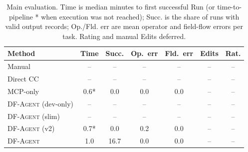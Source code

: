 \begin{table}[t]
\centering
\small
\setlength{\tabcolsep}{3pt}
\begin{tabular}{lcccccc}
\toprule
Method & Time & Succ. & Op.\ err & Fld.\ err & Edits & Rat. \\
\midrule
Manual & -- & -- & -- & -- & -- & -- \\
Direct CC & -- & -- & -- & -- & -- & -- \\
MCP-only & 0.6* & 0.0 & 0.0 & 0.0 & -- & -- \\
\textsc{DF-Agent} (dev-only) & -- & -- & -- & -- & -- & -- \\
\textsc{DF-Agent} (slim) & -- & -- & -- & -- & -- & -- \\
\textsc{DF-Agent} (v2) & 0.7* & 0.0 & 0.2 & 0.0 & -- & -- \\
\textsc{DF-Agent} & 1.0 & 16.7 & 0.0 & 0.0 & -- & -- \\
\bottomrule
\end{tabular}
\caption{Main evaluation. Time is median minutes to first successful Run (or time-to-pipeline * when execution was not reached); Succ. is the share of runs with valid output records; Op./Fld. err are mean operator and field-flow errors per task. Rating and manual Edits deferred.}
\label{tab:eval}
\end{table}
